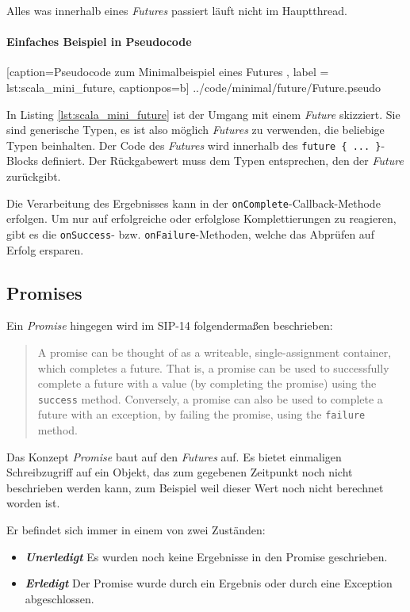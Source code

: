 Alles was innerhalb eines \emph{Futures} passiert läuft nicht im
Hauptthread.

\paragraph{Einfaches Beispiel in Pseudocode}


    [caption={Pseudocode zum Minimalbeispiel eines Futures },
       label = lst:scala_mini_future,
       captionpos=b]
 {../code/minimal/future/Future.pseudo}
 
In Listing \ref{lst:scala_mini_future} ist der Umgang mit einem \emph{Future}
skizziert. Sie sind generische Typen, es ist also möglich \emph{Futures}
zu verwenden, die beliebige Typen beinhalten. Der Code des \emph{Futures}
wird innerhalb des \texttt{future \{ ... \}}-Blocks definiert. Der
Rückgabewert muss dem Typen entsprechen, den der \emph{Future} zurückgibt.

Die Verarbeitung des Ergebnisses kann in der \texttt{onComplete}-Callback-Methode 
erfolgen. Um nur auf erfolgreiche oder erfolglose Komplettierungen
zu reagieren, gibt es die \texttt{onSuccess}- bzw. \texttt{onFailure}-Methoden,
welche das Abprüfen auf Erfolg ersparen.

\subsection{Promises}

Ein \emph{Promise} hingegen wird im SIP-14 folgendermaßen beschrieben:
\begin{quote}
A promise can be thought of as a writeable, single-assignment container, which 
completes a future. That is, a promise can be used to successfully complete a 
future with a value (by \glqq completing\grqq{} the promise) using the \texttt{success} method. 
Conversely, a promise can also be used to complete a future with an exception, 
by failing the promise, using the \texttt{failure} method.
\end{quote}

Das Konzept \emph{Promise} baut auf den \emph{Futures} auf. Es bietet
einmaligen Schreibzugriff auf ein Objekt, das zum gegebenen Zeitpunkt
noch nicht beschrieben werden kann, zum Beispiel weil dieser Wert
noch nicht berechnet worden ist.

Er befindet sich immer in einem von zwei Zuständen:
\begin{itemize}
 \item{\textbf{\emph{Unerledigt}} Es wurden noch keine Ergebnisse in den Promise geschrieben.}
 \item{\textbf{\emph{Erledigt}} Der Promise wurde durch ein Ergebnis oder durch eine Exception abgeschlossen.}
\end{itemize}

